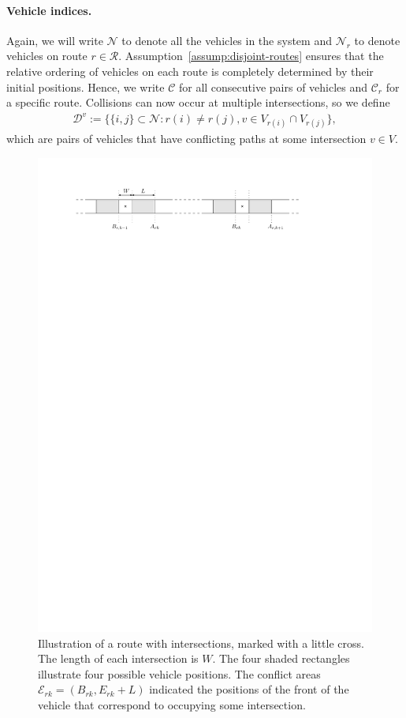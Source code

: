 \documentclass[a4paper]{report}
\theoremstyle{definition}
\theoremstyle{plain}
\begin{document}
\paragraph{Vehicle indices.}
Again, we will write $\mathcal{N}$ to denote all the vehicles in the system and
$\mathcal{N}_r$ to denote vehicles on route $r \in \mathcal{R}$.
%
Assumption~\ref{assump:disjoint-routes} ensures that the relative ordering of
vehicles on each route is completely determined by their initial positions.
Hence, we write $\mathcal{C}$ for all consecutive pairs of vehicles and
$\mathcal{C}_r$ for a specific route.
%
Collisions can now occur at multiple intersections, so we define
\begin{align}
  \label{eq:6}
  \mathcal{D}^v := \{ \{i, j\} \subset \mathcal{N} : r(i) \neq r(j) , v\in V_{r(i)} \cap V_{r(j)}\}  ,
\end{align}
which are pairs of vehicles that have conflicting paths at some intersection
$v \in V$.

\begin{figure}
  \centering
  \includegraphics[scale=1]{figures/motion/intersection}
  \caption{Illustration of a route with intersections, marked with a little
    cross. The length of each intersection is $W$. The four shaded rectangles
    illustrate four possible vehicle positions. The conflict areas
    $\mathcal{E}_{rk} = (B_{rk}, E_{rk} + L)$ indicated the positions of the front
    of the vehicle that correspond to occupying some intersection.}%
  \label{fig:intersections}
\end{figure}
\end{document}
